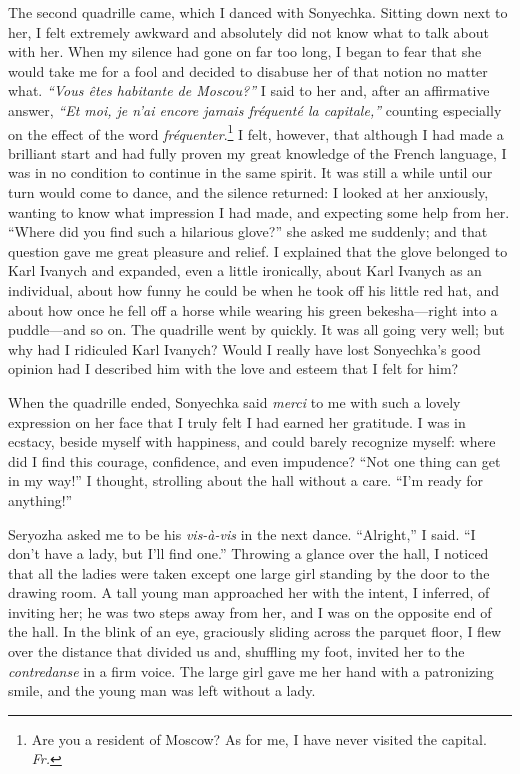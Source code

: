 The second quadrille came, which I danced with Sonyechka. Sitting down next to her, I felt extremely awkward and absolutely did not know what to talk about with her. When my silence had gone on far too long, I began to fear that she would take me for a fool and decided to disabuse her of that notion no matter what. \textit{``Vous \^etes habitante de Moscou?''} I said to her and, after an affirmative answer, \textit{``Et moi, je n'ai encore jamais fr\'equent\'e la capitale,''} counting especially on the effect of the word \textit{fr\'equenter}.\footnote{Are you a resident of Moscow? As for me, I have never visited the capital. \textit{Fr.}} I felt, however, that although I had made a brilliant start and had fully proven my great knowledge of the French language, I was in no condition to continue in the same spirit. It was still a while until our turn would come to dance, and the silence returned: I looked at her anxiously, wanting to know what impression I had made, and expecting some help from her. ``Where did you find such a hilarious glove?'' she asked me suddenly; and that question gave me great pleasure and relief. I explained that the glove belonged to Karl Ivanych and expanded, even a little ironically, about Karl Ivanych as an individual, about how funny he could be when he took off his little red hat, and about how once he fell off a horse while wearing his green bekesha---right into a puddle---and so on. The quadrille went by quickly. It was all going very well; but why had I ridiculed Karl Ivanych? Would I really have lost Sonyechka's good opinion had I described him with the love and esteem that I felt for him? %

When the quadrille ended, Sonyechka said \textit{merci} to me with such a lovely expression on her face that I truly felt I had earned her gratitude. I was in ecstacy, beside myself with happiness, and could barely recognize myself: where did I find this courage, confidence, and even impudence? ``Not one thing can get in my way!'' I thought, strolling about the hall without a care. ``I'm ready for anything!'' %

Seryozha asked me to be his \textit{vis-\`a-vis} in the next dance. ``Alright,'' I said. ``I don't have a lady, but I'll find one.'' Throwing a glance over the hall, I noticed that all the ladies were taken except one large girl standing by the door to the drawing room. A tall young man approached her with the intent, I inferred, of inviting her; he was two steps away from her, and I was on the opposite end of the hall. In the blink of an eye, graciously sliding across the parquet floor, I flew over the distance that divided us and, shuffling my foot, invited her to the \textit{contredanse} in a firm voice. The large girl gave me her hand with a patronizing smile, and the young man was left without a lady. %

